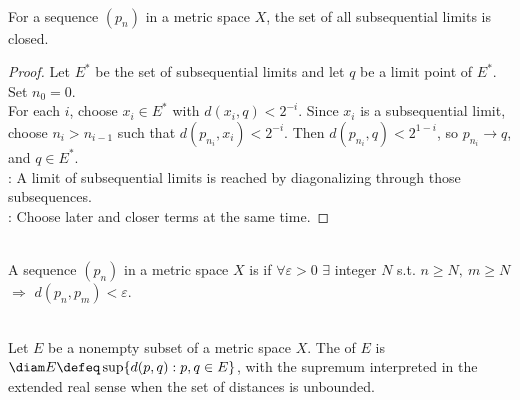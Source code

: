 \begin{theorem} \label{thm:subsequential-limits-closed} \\
For a sequence $(p_n)$ in a metric space $X$, the set of all subsequential limits is closed.
\begin{proof}
Let $E^*$ be the set of subsequential limits and let $q$ be a limit point of $E^*$. Set $n_0=0$.\\
For each $i$, choose $x_i\in E^*$ with $d(x_i,q)<2^{-i}$. Since $x_i$ is a subsequential limit, choose $n_i>n_{i-1}$ such that $d(p_{n_i},x_i)<2^{-i}$. Then $d(p_{n_i},q)<2^{1-i}$, so $p_{n_i}\to q$, and $q\in E^*$.\\
: A limit of subsequential limits is reached by diagonalizing through those subsequences.\\
: Choose later and closer terms at the same time.
\end{proof}
\end{theorem}

\begin{definition} \label{def:cauchy-sequence} \\
A sequence $(p_n)$ in a metric space $X$ is  if $\forall \varepsilon>0$  $\exists$ integer $N$ s.t. $n\geq N,\ m\geq N$ $\Longrightarrow$ $d(p_n,p_m)<\varepsilon$.
\end{definition}

\begin{definition} \label{def:diameter-of-metric-set} \\
Let $E$ be a nonempty subset of a metric space $X$. The  of $E$ is $\diam E\defeq\sup\{d(p,q):p,q\in E\}$, with the supremum interpreted in the extended real sense when the set of distances is unbounded.
\end{definition}

